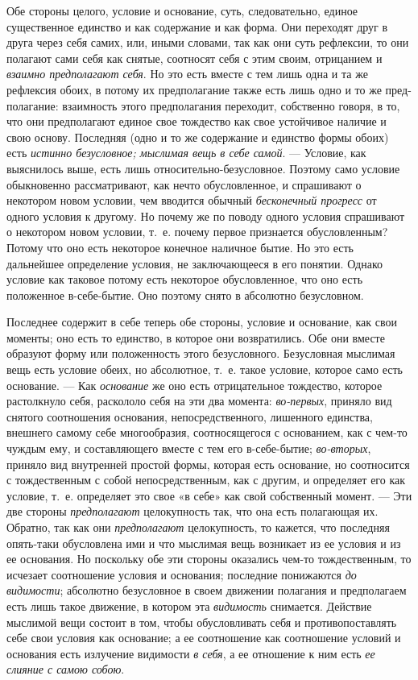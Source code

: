 Обе стороны целого, условие и основание, суть, следовательно, единое
существенное единство и как содержание и как форма. Они переходят друг в
друга через себя самих, или, иными словами, так как они суть рефлексии, то
они полагают сами себя как снятые, соотносят себя с этим своим, отрицанием
и {\em взаимно предполагают себя}. Но это есть вместе с
тем лишь одна и та же рефлексия обоих, в потому их предполагание также есть
лишь одно и то же пред- полагание: взаимность этого предполагания
переходит, собственно говоря, в то, что они предполагают единое свое
тождество как свое устойчивое наличие и свою основу. Последняя (одно и то
же содержание и единство формы обоих) есть {\em истинно
безусловное; мыслимая вещь в себе самой}. — Условие, как выяснилось выше,
есть лишь относительно-безусловное. Поэтому само условие обыкновенно
рассматривают, как нечто обусловленное, и спрашивают о некотором новом
условии, чем вводится обычный {\em бесконечный
прогресс} от одного условия к другому. Но почему же по поводу одного
условия спрашивают о некотором новом условии, т.~е. почему первое
признается обусловленным? Потому что оно есть некоторое конечное наличное
бытие. Но это есть дальнейшее определение условия, не заключающееся в его
понятии. Однако условие как таковое потому есть некоторое обусловленное,
что оно есть положенное в-себе-бытие. Оно поэтому снято в абсолютно
безусловном.

Последнее содержит в себе теперь обе стороны, условие и основание, как свои
моменты; оно есть то единство, в которое они возвратились. Обе они вместе
образуют форму или положенность этого безусловного. Безусловная мыслимая
вещь есть условие обеих, но абсолютное, т.~е. такое условие, которое само
есть основание. — Как {\em основание} же оно есть
отрицательное тождество, которое растолкнуло себя, раскололо себя на эти
два момента: {\em во-первых}, приняло вид снятого
соотношения основания, непосредственного, лишенного единства, внешнего
самому себе многообразия, соотносящегося с основанием, как с чем-то чуждым
ему, и составляющего вместе с тем его в-себе-бытие;
{\em во-вторых}, приняло вид внутренней простой формы,
которая есть основание, но соотносится с тождественным с собой
непосредственным, как с другим, и определяет его как условие, т.~е.
определяет это свое «в себе» как свой собственный момент. — Эти две стороны
{\em предполагают} целокупность так, что она есть
полагающая их. Обратно, так как они {\em предполагают}
целокупность, то кажется, что последняя опять-таки обусловлена ими и что
мыслимая вещь возникает из ее условия и из ее основания. Но поскольку обе
эти стороны оказались чем-то тождественным, то исчезает соотношение условия
и основания; последние понижаются {\em до видимости};
абсолютно безусловное в своем движении полагания и предполагаем есть лишь
такое движение, в котором эта {\em видимость}
снимается. Действие мыслимой вещи состоит в том, чтобы обусловливать себя и
противопоставлять себе свои условия как основание; а ее соотношение как
соотношение условий и основания есть излучение видимости
{\em в себя}, а ее отношение к ним есть
{\em ее слияние с самою собою}.


